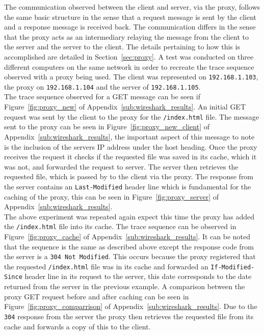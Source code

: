 \documentclass[10pt,twocolumn]{witseiepaper}
\begin{document}
		 The communication observed between the client and server, via the proxy, follows the same basic structure in the sense that a request message is sent by the client and a response message is received back. The communication differs in the sense that the proxy acts as an intermediary relaying the message from the client to the server and the server to the client. The details pertaining to how this is accomplished are detailed in Section~\ref{sec:proxy}. A test was conducted on three different computers on the same network in order to recreate the trace sequence observed with a proxy being used. The client was represented on \texttt{192.168.1.103}, the proxy on \texttt{192.168.1.104} and the server of \texttt{192.168.1.105}. \\
		 
		 The trace sequence observed for a GET message can be seen if Figure~\ref{fig:proxy_new} of Appendix~\ref{sub:wireshark_results}. An initial GET request was sent by the client to the proxy for the \texttt{/index.html} file. The message sent to the proxy can be seen in Figure~\ref{fig:proxy_new_client} of Appendix~\ref{sub:wireshark_results}, the important aspect of this message to note is the inclusion of the servers IP address under the host heading. Once the proxy receives the request it checks if the requested file was saved in its cache, which it was not, and forwarded the request to server. The server then retrieves the requested file, which is passed by to the client via the proxy. The response from the server contains an \texttt{Last-Modified} header line which is fundamental for the caching of the proxy, this can be seen in Figure~\ref{fig:proxy_server} of Appendix~\ref{sub:wireshark_results}. \\
		 
		 The above experiment was repeated again expect this time the proxy has added the \texttt{/index.html} file into its cache. The trace sequence can be observed in Figure~\ref{fig:proxy_cache} of Appendix~\ref{sub:wireshark_results}. It can be noted that the sequence is the same as described above except the response code from the server is a \texttt{304 Not Modified}. This occurs because the proxy registered that the requested \texttt{/index.html} file was in its cache and forwarded an \texttt{If-Modified-Since} header line in its request to the server, this date corresponds to the date returned from the server in the previous example. A comparison between the proxy GET request before and after caching can be seen in Figure~\ref{fig:proxy_comparrison} of Appendix~\ref{sub:wireshark_results}. Due to the \texttt{304} response from the server the proxy then retrieves the requested file from its cache and forwards a copy of this to the client.
	
\end{document}
